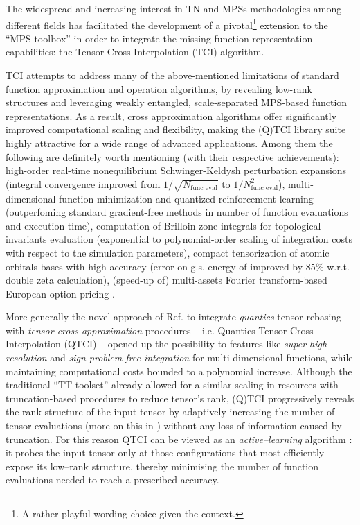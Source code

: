 The widespread and increasing interest in TN and MPSs methodologies among different fields has facilitated the development of a pivotal\footnote{A rather playful wording choice given the context.} extension to the ``MPS toolbox'' in order to integrate the missing function representation capabilities: the Tensor Cross Interpolation (TCI) algorithm.

TCI attempts to address many of the above-mentioned limitations of standard function approximation and operation algorithms, by revealing low-rank structures and leveraging weakly entangled, scale-separated MPS-based function representations. As a result, cross approximation algorithms offer significantly improved computational scaling and flexibility, making the (Q)TCI library suite \cite{Fernandez2024} highly attractive for a wide range of advanced applications. Among them the following are definitely worth mentioning (with their respective achievements): high-order real-time nonequilibrium Schwinger-Keldysh perturbation expansions \cite{Fernandez2022} (integral convergence improved from $1/\sqrt{N_{\text{func\_eval}}}$ to $1/N_{\text{func\_eval}}^2$), multi-dimensional function minimization and quantized reinforcement learning \cite{Sozykin2022} (outperfoming standard gradient-free methods in number of function evaluations and execution time), computation of Brilloin zone integrals for topological invariants evaluation \cite{Ritter2024} (exponential to polynomial-order scaling of integration costs with respect to the simulation parameters), compact tensorization of atomic orbitals bases with high accuracy \cite{Jolly2024} (error on g.s. energy of  improved by 85\% w.r.t. double zeta calculation), (speed-up of) multi-assets Fourier transform-based European option pricing \cite{Sakurai2025}.

More generally the novel approach of Ref. \cite{Fernandez2022, Fernandez2024} to integrate \textit{quantics} tensor rebasing with \textit{tensor cross approximation} procedures -- i.e. Quantics Tensor Cross Interpolation (QTCI) -- opened up the possibility to features like \textit{super-high resolution} and \textit{sign problem-free integration} for multi-dimensional functions, while maintaining computational costs bounded to a polynomial increase. Although the traditional ``TT-toolset'' already allowed for a similar scaling in resources with truncation-based procedures to reduce tensor's rank, (Q)TCI progressively reveals the rank structure of the input tensor by adaptively increasing the number of tensor evaluations (more on this in ) without any loss of information caused by truncation. For this reason QTCI can be viewed as an \emph{active–learning} algorithm
\cite{Settles2012}:  it probes the input tensor only at those configurations that most efficiently expose its low–rank structure, thereby minimising the number of function evaluations needed to reach a prescribed accuracy.

